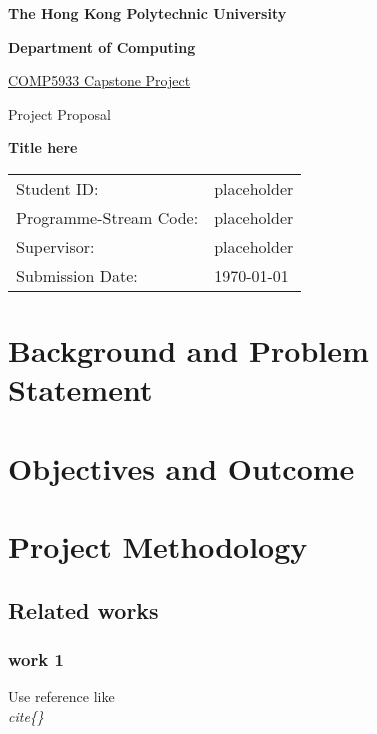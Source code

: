 \documentclass[12pt,a4paper]{article}
\begin{document}
\begin{center}
    \Large{\textbf{The Hong Kong Polytechnic University}}

    \Large{\textbf{Department of Computing}}
    \vspace{1cm}
    
    \underline{COMP5933 Capstone Project}
    
    Project Proposal
    
    \vspace{4cm}
    
    \Huge{\textbf{Title here}}
    
    \vspace*{\fill}
    \begin{tabular}{ll}
    \large{Student ID:}& \large{placeholder} \\
    \large{Programme-Stream Code:}& \large{placeholder} \\
    \large{Supervisor:}&  \large{placeholder} \\
    \large{Submission Date:}& \large{\today} \\
    \end{tabular}
\end{center}
\thispagestyle{empty}
\newpage

\tableofcontents
\thispagestyle{empty}
\newpage


\setcounter{page}{1}
\section{Background and Problem Statement}


\section{Objectives and Outcome}


\section{Project Methodology}
\subsection{Related works}
\subsubsection{work 1}
Use reference like\cite{konishi:1999ab} \textit{\\cite\{\}}
\end{document}
